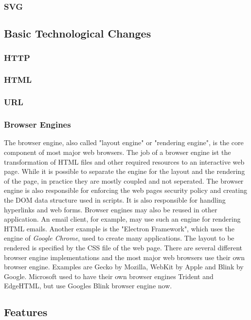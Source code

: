 \documentclass[runningheads]{llncs}
\begin{document}
			\subsubsection{SVG}%
		\subsection{Basic Technological Changes}
			\subsubsection{HTTP}
			\subsubsection{HTML}
			\subsubsection{URL}
			\subsubsection{Browser Engines}
			The browser engine, also called "layout engine" or "rendering engine", is the core component of most major web browsers. The job of a browser engine ist the transformation of HTML files and other required resources to an interactive web page. While it is possible to separate the engine for the layout and the rendering of the page, in practice they are mostly coupled and not seperated. The browser engine is also responsible for enforcing the web pages security policy and creating the DOM data structure used in scripts. It is also responsible for handling hyperlinks and web forms.
			Browser engines may also be reused in other application. An email client, for example, may use such an engine for rendering HTML emails. Another example is the "Electron Framework", which uses the engine of \textit{Google Chrome}, used to create many applications. The layout to be rendered is specified by the CSS file of the web page. There are several different browser engine implementations and the most major web browsers use their own browser engine. Examples are Gecko by Mozilla, WebKit by Apple and Blink by Google. Microsoft used to have their own browser engines Trident and EdgeHTML, but use Googles Blink browser engine now.
		\subsection{Features}
\end{document}
